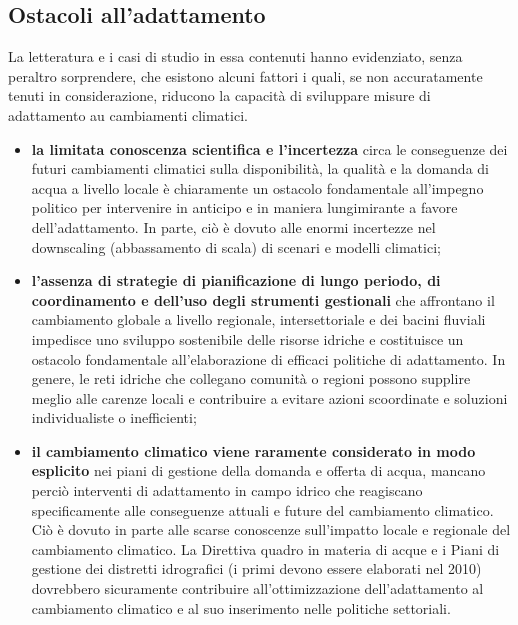\documentclass[14pt,a4paper]{article}
\begin{document}
	\subsection{Ostacoli all'adattamento}
		La letteratura e i casi di studio in essa contenuti hanno evidenziato, senza peraltro sorprendere, che esistono alcuni fattori i quali, se non accuratamente tenuti in considerazione, riducono la capacità di sviluppare misure di adattamento au cambiamenti climatici.
		
		\begin{itemize}
		\item \textbf{la limitata conoscenza scientifica e l'incertezza} circa le conseguenze dei futuri cambiamenti climatici sulla disponibilità, la qualità e la domanda di acqua a livello locale è chiaramente un ostacolo fondamentale all'impegno politico per intervenire in anticipo e in maniera lungimirante a favore dell'adattamento. In parte, ciò è dovuto alle enormi incertezze nel downscaling (abbassamento di scala) di scenari e modelli climatici;
		\item \textbf{l'assenza di strategie di pianificazione di lungo periodo, di coordinamento e dell'uso degli strumenti gestionali} che affrontano il cambiamento globale a livello regionale, intersettoriale e dei bacini fluviali impedisce
		uno sviluppo sostenibile delle risorse idriche e costituisce un ostacolo fondamentale all'elaborazione di efficaci politiche di adattamento. In genere, le reti idriche che  collegano comunità o regioni possono supplire meglio alle carenze locali e contribuire a evitare azioni scoordinate e soluzioni individualiste o inefficienti;
		\item \textbf{il cambiamento climatico viene raramente considerato in modo esplicito }nei piani di gestione della domanda e offerta di acqua, mancano perciò interventi di adattamento in
		campo idrico che reagiscano specificamente alle	conseguenze attuali e future del cambiamento climatico. Ciò è dovuto in parte alle scarse conoscenze sull'impatto locale e regionale del cambiamento climatico. La Direttiva quadro in materia di acque e i Piani di gestione dei distretti idrografici (i primi devono essere	elaborati nel 2010) dovrebbero sicuramente contribuire all'ottimizzazione dell'adattamento
		al cambiamento climatico e al suo inserimento nelle politiche settoriali.
		\end{itemize}
		
		
		
		
	\newpage
	
	
	
	\newpage
	\appendix
\end{document}
